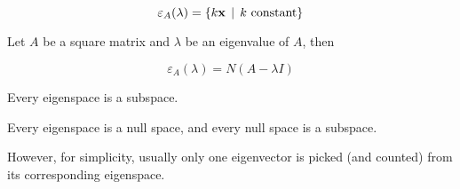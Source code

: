 \documentclass[a4paper,12pt]{article}
\begin{document}
$$\varepsilon_{A}(\lambda)=\left\{ k\mathbf{x}\,\mid\, k\text{ constant}\right\}$$\s

\begin{thm}
  Let $A$ be a square matrix and $\lambda$ be an eigenvalue of $A$, then

  $$\varepsilon_{A}(\lambda)=N(A-\lambda I)$$
\end{thm}\n
  
\begin{crl}
  Every eigenspace is a subspace.\n

  \prf Every eigenspace is a null space, and every null space is a subspace.
\end{crl}\n

However, for simplicity, usually only one eigenvector is picked (and counted) from its corresponding eigenspace.\n
\end{document}
